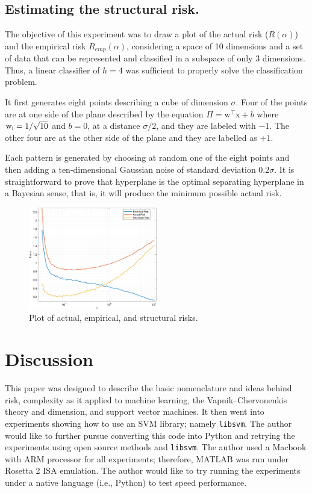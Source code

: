 \documentclass[journal]{IEEEtran}
\begin{document}
\subsection{Estimating the structural risk.}

The objective of this experiment was to draw a plot of the actual risk ($R(\alpha )$) and the empirical risk $R_{emp} (\alpha )$, considering a space of 10 dimensions and a set of data that can be represented and classified in a subspace of only 3 dimensions. Thus, a linear classifier of $h=4$ was sufficient to properly solve the classification problem.

It first generates eight points describing a cube of dimension \( \sigma \). Four of the points are at one side of the plane described by the equation \( \Pi = \bm{\mathrm{w}}^\top\bm{\mathrm{x}} + b \) where \( \rm w_i = 1/\sqrt{10} \) and \( b = 0 \), at a distance \( \sigma /2 \), and they are labeled with \( -1 \). The other four are at the other side of the plane and they are labelled as \( +1 \).

Each pattern is generated by choosing at random one of the eight points and then adding a ten-dimensional Gaussian noise of standard deviation \( 0.2 \sigma \). It is straightforward to prove that hyperplane  is the optimal separating hyperplane in a Bayesian sense, that is, it will produce the minimum possible actual risk.

\begin{figure}[ht]
    \centering
    \includegraphics[width=0.5\textwidth]{figure01.png}
    \vspace{-1em}\caption{Plot of actual, empirical, and structural risks.}
    \label{fig:Risks}
\end{figure}

\section{Discussion}

This paper was designed to describe the basic nomenclature and ideas behind risk, complexity as it applied to machine learning, the Vapnik--Chervonenkis theory and dimension, and support vector machines. It then went into experiments showing how to use an SVM library; namely \texttt{libsvm}. The author would like to further pursue converting this code into Python and retrying the experiments using open source methods and \texttt{libsvm}. The author used a Macbook with ARM processor for all experiments; therefore, MATLAB was run under Rosetta 2 ISA emulation. The author would like to try running the experiments under a native language (i.e., Python) to test speed performance.
\end{document}
